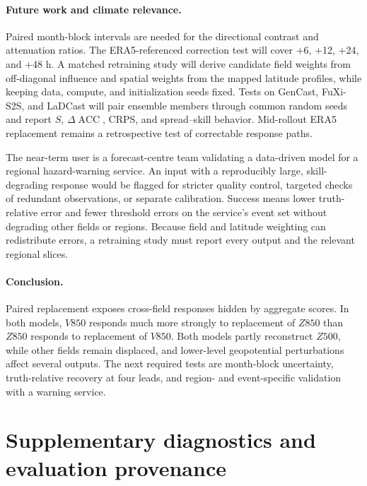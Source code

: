 \documentclass{article}
\newcommand{\acc}{\operatorname{ACC}}
\begin{document}
\paragraph{Future work and climate relevance.} Paired month-block intervals are needed for the directional contrast and attenuation ratios. The ERA5-referenced correction test will cover +6, +12, +24, and +48 h. A matched retraining study will derive candidate field weights from off-diagonal influence and spatial weights from the mapped latitude profiles, while keeping data, compute, and initialization seeds fixed. Tests on GenCast, FuXi-S2S, and LaDCast will pair ensemble members through common random seeds and report $S$, $\Delta\acc$, CRPS, and spread--skill behavior. Mid-rollout ERA5 replacement remains a retrospective test of correctable response paths.

The near-term user is a forecast-centre team validating a data-driven model for a regional hazard-warning service. An input with a reproducibly large, skill-degrading response would be flagged for stricter quality control, targeted checks of redundant observations, or separate calibration. Success means lower truth-relative error and fewer threshold errors on the service's event set without degrading other fields or regions. Because field and latitude weighting can redistribute errors, a retraining study must report every output and the relevant regional slices.

\paragraph{Conclusion.} Paired replacement exposes cross-field responses hidden by aggregate scores. In both models, $V850$ responds much more strongly to replacement of $Z850$ than $Z850$ responds to replacement of $V850$. Both models partly reconstruct $Z500$, while other fields remain displaced, and lower-level geopotential perturbations affect several outputs. The next required tests are month-block uncertainty, truth-relative recovery at four leads, and region- and event-specific validation with a warning service.

\clearpage



\clearpage
\appendix
\section{Supplementary diagnostics and evaluation provenance}
\label{app:figures}
\renewcommand{\thefigure}{A\arabic{figure}}
\renewcommand{\theHfigure}{A\arabic{figure}}
\setcounter{figure}{0}
\end{document}
